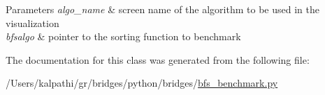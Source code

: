 \begin{DoxyParams}{Parameters}
{\em algo\+\_\+name} & screen name of the algorithm to be used in the visualization \\
\hline
{\em bfsalgo} & pointer to the sorting function to benchmark \\
\hline
\end{DoxyParams}


The documentation for this class was generated from the following file\+:\begin{DoxyCompactItemize}
\item 
/\+Users/kalpathi/gr/bridges/python/bridges/\mbox{\hyperlink{bfs__benchmark_8py}{bfs\+\_\+benchmark.\+py}}\end{DoxyCompactItemize}
